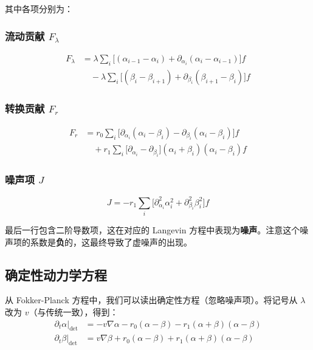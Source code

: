 其中各项分别为：

\subsubsection{流动贡献 $F_\lambda$}
\begin{align}
F_\lambda &= \lambda \sum_i \Big[(\alpha_{i-1} - \alpha_i) + \partial_{\alpha_i}(\alpha_i - \alpha_{i-1})\Big]f \nonumber\\
&\quad - \lambda \sum_i \Big[(\beta_i - \beta_{i+1}) + \partial_{\beta_i}(\beta_{i+1} - \beta_i)\Big]f \label{eq:f-lambda}
\end{align}

\subsubsection{转换贡献 $F_r$}
\begin{align}
F_r &= r_0 \sum_i \Big[\partial_{\alpha_i}(\alpha_i - \beta_i) - \partial_{\beta_i}(\alpha_i - \beta_i)\Big]f \nonumber\\
&\quad + r_1 \sum_i \Big[\partial_{\alpha_i} - \partial_{\beta_i}\Big](\alpha_i + \beta_i)(\alpha_i - \beta_i)f \label{eq:f-r}
\end{align}

\subsubsection{噪声项 $J$}

\begin{equation}\label{eq:noise-term}
\boxed{J = -r_1 \sum_i \Big[\partial_{\alpha_i}^2 \alpha_i^2 + \partial_{\beta_i}^2 \beta_i^2\Big]f}
\end{equation}

最后一行包含二阶导数项，这在对应的 Langevin 方程中表现为\textbf{噪声}。注意这个噪声项的系数是\textbf{负}的，这最终导致了虚噪声的出现。

\subsection{确定性动力学方程}\label{subsec:det-eom}

从 Fokker-Planck 方程中，我们可以读出确定性方程（忽略噪声项）。将记号从 $\lambda$ 改为 $v$（与传统一致），得到：
\begin{align}
\partial_t \alpha\big|_{\text{det}} &= -v\nabla\alpha - r_0(\alpha - \beta) - r_1(\alpha + \beta)(\alpha - \beta) \label{eq:det-alpha}\\
\partial_t \beta\big|_{\text{det}} &= v\nabla\beta + r_0(\alpha - \beta) + r_1(\alpha + \beta)(\alpha - \beta) \label{eq:det-beta}
\end{align}

